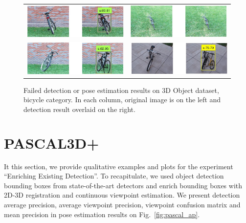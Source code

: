\documentclass[10pt,twocolumn,letterpaper]{article}
\begin{document}
\begin{figure}[h]
\setlength\tabcolsep{1pt}
\centering
\begin{tabular}{|c|c|}
\hline 
  \includegraphics[width=0.40\linewidth]{supp/bicycle1.png} &
  \includegraphics[width=0.40\linewidth]{supp/bicycle5.png} \\
  \includegraphics[width=0.40\linewidth]{supp/bicycle19.png} &
  \includegraphics[width=0.40\linewidth]{supp/bicycle20.png} \\
\hline
\end{tabular}
\caption{Failed detection or pose estimation results on 3D Object dataset, bicycle
category. In each column, original image is on the left and detection result overlaid on
the right.}%
  \label{fig:3dobject_bicycle_bad}
\end{figure}

\section{PASCAL3D+}

It this section, we provide qualitative examples and plots for the experiment
``Enriching Existing Detection''. To recapitulate, we used object detection
bounding boxes from state-of-the-art detectors \cite{Girshick14, Pepik12} and
enrich bounding boxes with 2D-3D registration and continuous viewpoint
estimation. We present detection average precision, average viewpoint
precision, viewpoint confusion matrix and mean precision in pose estimation
results on Fig.~\ref{fig:pascal_ap}. 
\end{document}
